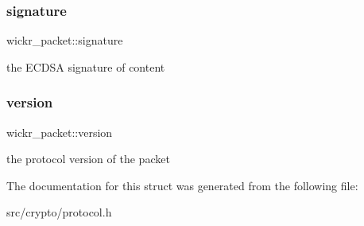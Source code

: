 \subsubsection{\texorpdfstring{signature}{signature}}
{\footnotesize\ttfamily wickr\+\_\+packet\+::signature}

the E\+C\+D\+SA signature of \textquotesingle{}content\textquotesingle{} \mbox{\label{structwickr__packet_a35c17c926c267a603e810b88961c2bf3}} 
\subsubsection{\texorpdfstring{version}{version}}
{\footnotesize\ttfamily wickr\+\_\+packet\+::version}

the protocol version of the packet 

The documentation for this struct was generated from the following file\+:\begin{DoxyCompactItemize}
\item 
src/crypto/protocol.\+h\end{DoxyCompactItemize}
